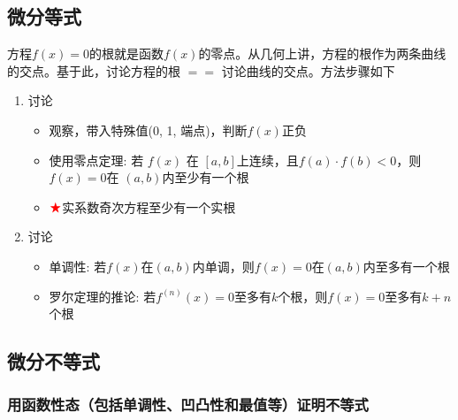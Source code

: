 \documentclass[../book.tex]{subfiles}
\begin{document}
    \subsection{微分等式}

    方程$f(x) = 0$的根就是函数$f(x)$的零点。从几何上讲，方程的根作为两条曲线的交点。基于此，讨论方程的根 $==$ 讨论曲线的交点。方法步骤如下

    \begin{enumerate}
        \item 讨论{\color{red}{存在性}}
        \begin{itemize}
            \item 观察，带入特殊值(0, 1, 端点)，判断$f(x)$正负
            \item 使用零点定理: 若 $f(x)$ 在 $[a, b]$上连续，且$f(a)\cdot f(b) < 0$，则$f(x) = 0$在 $(a, b)$内至少有一个根
            \item $\color{red}{\bigstar}$实系数奇次方程至少有一个实根
        \end{itemize}
        \item 讨论{\color{red}{唯一性}}
        \begin{itemize}
            \item 单调性: 若$f(x)$在$(a, b)$内单调，则$f(x) = 0$在$(a, b)$内至多有一个根
            \item 罗尔定理的推论: 若$f^{(n)}(x) = 0$至多有$k$个根，则$f(x) = 0$至多有$k + n$个根
        \end{itemize}
    \end{enumerate}

    \subsection{微分不等式}

    \subsubsection{用函数性态（包括单调性、凹凸性和最值等）证明不等式}
\end{document}
